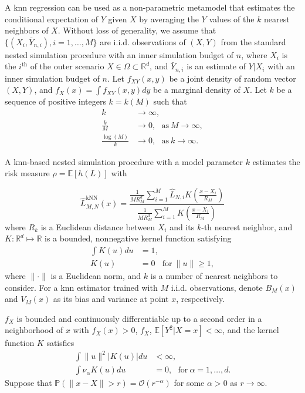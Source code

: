 A \gls{knn} regression can be used as a non-parametric metamodel that estimates the conditional expectation of $Y$ given $X$ by averaging the $Y$ values of the $k$ nearest neighbors of $X$.
Without loss of generality, we assume that $\{(X_i, \bar{Y}_{n, i}), i = 1, \dots, M\}$ are i.i.d. observations of $(X, Y)$ from the standard nested simulation procedure with an inner simulation budget of $n$, where $X_i$ is the $i^{\text{th}}$ of the outer scenario $X \in \Omega \subset \mathbb{R}^d$, and $\bar{Y}_{n, i}$ is an estimate of $Y|X_i$ with an inner simulation budget of $n$.
Let $f_{XY}(x, y)$ be a joint density of random vector $(X, Y)$, and $f_X(x) = \int f_{XY}(x, y) dy$ be a marginal density of $X$.
Let $k$ be a sequence of positive integers $k = k(M)$ such that 
\begin{align*}
    k                   & \to \infty, \\
    \frac{k}{M}         & \to 0, ~~~ \text{as} ~ M \to \infty, \\
    \frac{\log(M)}{k}   & \to 0, ~~~ \text{as} ~ k \to \infty.
\end{align*}

A \gls{knn}-based nested simulation procedure with a model parameter $k$ estimates the risk measure $\rho = \mathbb{E} \left[ h(L) \right]$ with

\begin{equation*}
    \hat{L}^{\text{kNN}}_{M, N}(x) 
    = \frac{\frac{1}{M R_M^d} \sum_{i=1}^M \hat{L}_{N, i} K\left(\frac{x - X_i}{R_M}\right)}{\frac{1}{M R_M^d} \sum_{i=1}^M K\left(\frac{x - X_i}{R_M}\right)}
    \end{equation*}
    where $R_k$ is a Euclidean distance between $X_i$ and its $k$-th nearest neighbor, and $K:\mathbb{R}^d \mapsto \mathbb{R}$ is a bounded, nonnegative kernel function satisfying 
    \begin{align*}
        \int K(u) du & = 1, \\
        K(u) &= 0 ~~~ ~\text{for}~ \|u\| \geq 1,
    \end{align*}
where $\|\cdot\|$ is a Euclidean norm, and $k$ is a number of nearest neighbors to consider.
For a \gls{knn} estimator trained with $M$ i.i.d. observations, denote $B_M(x)$ and $V_M(x)$ as its bias and variance at point $x$, respectively.

\begin{assumption}\label{as1:knn}
    $f_X$ is bounded and continuously differentiable up to a second order in a neighborhood of $x$ with $f_X(x) > 0$, $f_X$, $\mathbb{E} \left[ Y^2| X = x \right] < \infty$, and the kernel function $K$ satisfies
    \begin{align*}
        \int \|u\|^2  |K(u)| du & < \infty, \\
        \int \nu_\alpha K(u) du & = 0, ~~~ \text{for}~ \alpha = 1, \dots, d.
    \end{align*}
    Suppose that $\mathbb{P}(\|x - X\| > r) = \mathcal{O}(r^{-\alpha})$ for some $\alpha > 0$ as $r \to \infty$.
\end{assumption}

